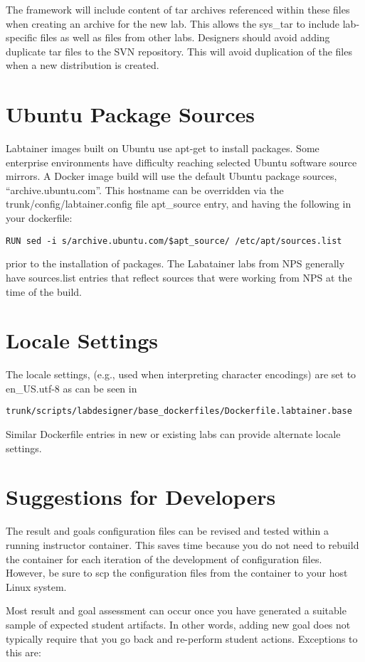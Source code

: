 \documentclass[12pt]{article}
\begin{document}
The framework will include content of tar archives referenced within these files
when creating an archive for the new lab.  This allows the sys\_tar to include lab-specific files
as well as files from other labs.  Designers should avoid adding duplicate tar files to the SVN repository.
This will avoid duplication of the files when a new distribution is created.

\section{Ubuntu Package Sources}
Labtainer images built on Ubuntu use apt-get to install packages.  Some enterprise environments have 
difficulty reaching selected Ubuntu software source mirrors.  A Docker image build will use the default 
Ubuntu package sources, ``archive.ubuntu.com''.  This hostname can be overridden via the 
trunk/config/labtainer.config file apt\_source entry, and having the following in your dockerfile:
\begin{verbatim}
RUN sed -i s/archive.ubuntu.com/$apt_source/ /etc/apt/sources.list
\end{verbatim}
\noindent prior to the installation of packages.  The Labatainer labs from NPS 
generally have sources.list entries that reflect sources that were working from NPS at the time of the build.

\section{Locale Settings}
The locale settings, (e.g., used when interpreting character encodings) are set to en\_US.utf-8 
as can be seen in 
\begin{verbatim}
trunk/scripts/labdesigner/base_dockerfiles/Dockerfile.labtainer.base
\end{verbatim}
Similar Dockerfile entries in new or existing labs can provide alternate locale settings.

\section{Suggestions for Developers}
The result and goals configuration files can be revised and tested within a
running instructor container.  This saves time because you do not need to rebuild
the container for each iteration of the development of configuration files.  However,
be sure to scp the configuration files from the container to your host Linux system.

Most result and goal assessment can occur once you have generated a suitable sample of
expected student artifacts.  In other words, adding new goal does not typically require
that you go back and re-perform student actions.  Exceptions to this are:
\end{document}
